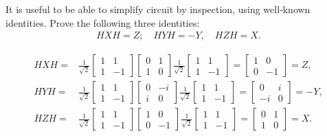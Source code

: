 \documentclass[en]{sol-man}
\begin{document}
\begin{exe}
    It is useful to be able to simplify circuit by inspection, using well-known identities. Prove the following three identities:
    \begin{align}
        HXH=Z;\quad HYH=-Y,\quad HZH=X.
    \end{align}
\end{exe}
\begin{pf}
    \begin{align}
        HXH=&\frac{1}{\sqrt{2}}\begin{bmatrix}
            1&1\\
            1&-1
        \end{bmatrix}\begin{bmatrix}
            0&1\\
            1&0
        \end{bmatrix}\frac{1}{\sqrt{2}}\begin{bmatrix}
            1&1\\
            1&-1
        \end{bmatrix}=\begin{bmatrix}
            1&0\\
            0&-1
        \end{bmatrix}=Z,\\
        HYH=&\frac{1}{\sqrt{2}}\begin{bmatrix}
            1&1\\
            1&-1
        \end{bmatrix}\begin{bmatrix}
            0&-i\\
            i&0
        \end{bmatrix}\frac{1}{\sqrt{2}}\begin{bmatrix}
            1&1\\
            1&-1
        \end{bmatrix}=\begin{bmatrix}
            0&i\\
            -i&0
        \end{bmatrix}=-Y,\\
        HZH=&\frac{1}{\sqrt{2}}\begin{bmatrix}
            1&1\\
            1&-1
        \end{bmatrix}\begin{bmatrix}
            1&0\\
            0&-1
        \end{bmatrix}\frac{1}{\sqrt{2}}\begin{bmatrix}
            1&1\\
            1&-1
        \end{bmatrix}=\begin{bmatrix}
            0&1\\
            1&0
        \end{bmatrix}=X.
    \end{align}
\end{pf}
\end{document}
